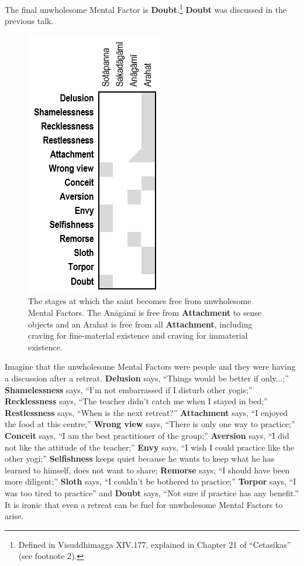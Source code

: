 The final unwholesome Mental Factor is \textbf{Doubt}.\footnote{Defined in Visuddhimagga XIV.177, explained in Chapter 21 of “Cetasikas” (see footnote 2).} \textbf{Doubt} was discussed in the previous talk.

\begin{figure}[h]
\centering
\includegraphics[width=0.3\linewidth]{./Diagrams/Freedom}
\caption{The stages at which the saint becomes free from unwholesome Mental Factors. The Anāgāmī is free from \textbf{Attachment} to sense objects and an Arahat is free from all \textbf{Attachment}, including craving for fine-material existence and craving for immaterial existence.}
\label{fig:Freedom}
\end{figure}

Imagine that the unwholesome Mental Factors were people and they were having a discussion after a retreat. \textbf{Delusion} says, “Things would be better if only...;” \textbf{Shamelessness} says, “I’m not embarrassed if I disturb other yogis;” \textbf{Recklessness} says, “The teacher didn’t catch me when I stayed in bed;” \textbf{Restlessness} says, “When is the next retreat?” \textbf{Attachment} says, “I enjoyed the food at this centre;” \textbf{Wrong view} says, “There is only one way to practice;” \textbf{Conceit} says, “I am the best practitioner of the group;” \textbf{Aversion} says, “I did not like the attitude of the teacher;” \textbf{Envy} says, “I wish I could practice like the other yogi;” \textbf{Selfishness} keeps quiet because he wants to keep what he has learned to himself, does not want to share; \textbf{Remorse} says, “I should have been more diligent;” \textbf{Sloth} says, “I couldn’t be bothered to practice;” \textbf{Torpor} says, “I was too tired to practice” and \textbf{Doubt} says, “Not sure if practice has any benefit.” It is ironic that even a retreat can be fuel for unwholesome Mental Factors to arise.

